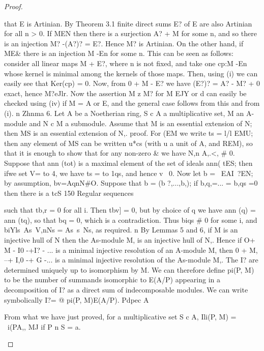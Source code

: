 \begin{proof}
\begin{mathematicalrecord}
that E is Artinian. By Theorem 3.1 finite direct sums E? of E are also
Artinian for all n > 0.
   If MEN then there is a surjection A? + M for some n, and so there
is an injection M? -(A?)?      = E?. Hence M? is Artinian. On the other
 hand, if ME& there is an injection M -En           for some n. This can be
seen as follows: consider all linear maps M + E?, where n is not fixed,
and take one cp:M -En         whose kernel is minimal among the kernels of
 those maps. Then, using (i) we can easily see that Ker(cp) = 0. Now, from
0 + M - E? we have (E?)? = A? - M? + 0 exact, hence M?eJlr. Now the
 assertion M z M? for M EJY or d can easily be checked using (iv) if M = A
 or E, and the general case follows from this and from (i). n
Zhnma 6. Let A be a Noetherian ring, S c A a multiplicative      set, M an A-
module and N c M a submodule. Assume that M is an essential extension
of N; then MS is an essential extension of N,.
proof. For (EM we write ts = l/l EMU; then any element of MS can be
written u*cs (with u a unit of A, and REM), so that it is enough to show that
for any non-zero & we have N,n A,.<, # 0. Suppose that ann (tot) is a
maximal element of the set of ideals {ann(    tES}; then ifwe set V= to 4, we
have ts = to 1qs, and hence v ~0. Now let b = {~EAI~?EN};                  by
assumption,
         bv=AqnN#O.
Suppose that b = (b ?,...,b,);   if b,q,=...   = b,qs =0 then there is a tcS
150      Regular sequences

such that tb,r = 0 for all i. Then tbv] = 0, but by choice of q we have
ann (q) = ann (tq), so that bq = 0, which is a contradiction. Thus biqs # 0
for some i, and
           biYls~As~V,nNs = As~s~Ns,
 as required.     n
    By Lemmas 5 and 6, if M is an injective hull of N then the As-module
M, is an injective hull of N,. Hence if O+ M - I0 -+I?          - ... is
a minimal injective resolution of an A-module M, then 0 + M, --+ I,0 -+
G -...      is a minimal injective resolution of the As-module M,. The
I? are determined uniquely up to isomorphism by M. We can therefore
define pi(P, M) to be the number of summands isomorphic to E(A/P)
appearing in a decomposition of I? as a direct sum of indecomposable
modules. We can write symbolically
         I?=          @       pi(P, M)E(A/P).
                  Pdpec   A

From what we have just proved, for a multiplicative          set S c A,
      Ili(P, M) = ~i(PA,, MJ   if P n S = a.
\end{mathematicalrecord}
\end{proof}



